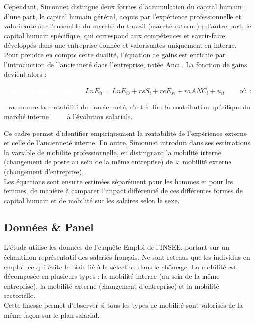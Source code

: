 \documentclass{article}
\begin{document}
\vspace{5pt}
 
Cependant, Simonnet distingue deux formes d’accumulation du capital humain : d’une part, le capital humain général, acquis par l’expérience professionnelle et valorisante sur l’ensemble du marché du travail (marché externe) ; d’autre part, le capital humain spécifique, qui correspond aux compétences et savoir-faire développés dans une entreprise donnée et valorisantes uniquement en interne. \\
Pour prendre en compte cette dualité, l’équation de gains est enrichie par l’introduction de l’ancienneté dans l’entreprise, notée Anci . La fonction de gains devient alors :

\vspace{5pt}

\textcolor{white}{12345678912345678912345}
$Ln E_{it} = Ln E_{i0} + rsS_i + reE_{xi} + raANC_i + u_{it} $
\textcolor{white}{123}  où :

\vspace{5pt}

 - ra mesure la rentabilité de l’ancienneté, c’est-à-dire la contribution spécifique du marché interne \textcolor{white}{1234} à l’évolution salariale.

\vspace{5pt}
 
Ce cadre permet d’identifier empiriquement la rentabilité de l’expérience externe et celle de l’ancienneté interne. En outre, Simonnet introduit dans ses estimations la variable de mobilité professionnelle, en distinguant la mobilité interne (changement de poste au sein de la même entreprise) de la mobilité externe (changement d’entreprise). \\
Les équations sont ensuite estimées séparément pour les hommes et pour les femmes, de manière à comparer l’impact différencié de ces différentes formes de capital humain et de mobilité sur les salaires selon le sexe.

\subsection{Données \& Panel}

L’étude utilise les données de l’enquête Emploi de l’INSEE, portant sur un échantillon représentatif des salariés français. Ne sont retenus que les individus en emploi, ce qui évite le biais lié à la sélection dans le chômage. La mobilité est décomposée en plusieurs types : la mobilité interne (au sein de la même entreprise), la mobilité externe (changement d’entreprise) et la mobilité sectorielle.\\
Cette finesse permet d’observer si tous les types de mobilité sont valorisés de la même façon sur le plan salarial.
\end{document}
